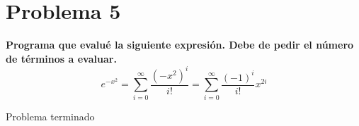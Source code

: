 \section*{Problema 5}
\textbf{Programa que evalué la siguiente expresión. Debe de pedir el número de términos a evaluar.}
\begin{equation*}
    e^{-x^2} = \sum_{i=0}^\infty \frac{(-x^2)^i}{i!} = \sum_{i=0}^\infty \frac{(-1)^i}{i!} x^{2i}
\end{equation*}

Problema terminado